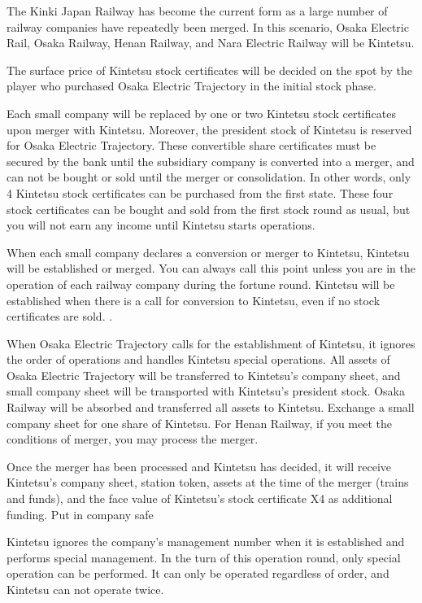 \documentclass{article}
\begin{document}
\begin{CJK}{UTF8}{min}
The Kinki Japan Railway has become the current form as a large number of railway companies have repeatedly been merged. In this scenario, Osaka Electric Rail, Osaka Railway, Henan Railway, and Nara Electric Railway will be Kintetsu.

The surface price of Kintetsu stock certificates will be decided on the spot by the player who purchased Osaka Electric Trajectory in the initial stock phase.

Each small company will be replaced by one or two Kintetsu stock certificates upon merger with Kintetsu. Moreover, the president stock of Kintetsu is reserved for Osaka Electric Trajectory. These convertible share certificates must be secured by the bank until the subsidiary company is converted into a merger, and can not be bought or sold until the merger or consolidation. In other words, only 4 Kintetsu stock certificates can be purchased from the first state. These four stock certificates can be bought and sold from the first stock round as usual, but you will not earn any income until Kintetsu starts operations.

When each small company declares a conversion or merger to Kintetsu, Kintetsu will be established or merged. You can always call this point unless you are in the operation of each railway company during the fortune round. Kintetsu will be established when there is a call for conversion to Kintetsu, even if no stock certificates are sold. .

When Osaka Electric Trajectory calls for the establishment of Kintetsu, it ignores the order of operations and handles Kintetsu special operations. All assets of Osaka Electric Trajectory will be transferred to Kintetsu's company sheet, and small company sheet will be transported with Kintetsu's president stock. Osaka Railway will be absorbed and transferred all assets to Kintetsu. Exchange a small company sheet for one share of Kintetsu. For Henan Railway, if you meet the conditions of merger, you may process the merger.

Once the merger has been processed and Kintetsu has decided, it will receive Kintetsu's company sheet, station token, assets at the time of the merger (trains and funds), and the face value of Kintetsu's stock certificate X4 as additional funding. Put in company safe

Kintetsu ignores the company's management number when it is established and performs special management. In the turn of this operation round, only special operation can be performed. It can only be operated regardless of order, and Kintetsu can not operate twice.


\end{CJK}
\end{document}
